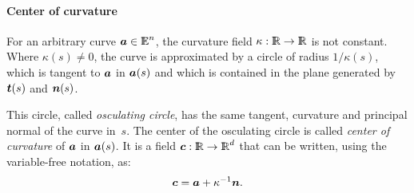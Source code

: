 \documentclass{31x47jw}
\begin{document}
% 
% 
%     
% 


\paragraph{Center of curvature}


For an arbitrary curve ${\mbox{\boldmath $a$}} \in \mathbb{I\!\!E}^{n}$, the curvature field
$\kappa:\mathbb{I\!\!R}\rightarrow\mathbb{I\!\!R}$ is not constant.  Where
$\kappa(s)\not=0$, the curve is approximated by a circle of radius
$1/\kappa(s)$, which is tangent to ${\mbox{\boldmath $a$}}$ in ${\mbox{\boldmath $a$}}(s)$ and which is
contained in the plane generated by ${\mbox{\boldmath $t$}}(s)$ and ${\mbox{\boldmath $n$}}(s)$.

This circle, called \emph{osculating circle}, has the same tangent, curvature
and principal normal of the curve in~$s$.  The center of the
osculating circle is called \emph{center of curvature} of ${\mbox{\boldmath $a$}}$ in
${\mbox{\boldmath $a$}}(s)$. It is a field ${\mbox{\boldmath $c$}}: \mathbb{I\!\!R}\rightarrow\mathbb{I\!\!R}^{d}$ that can be 
written, using the variable-free notation, as:
\[
{\mbox{\boldmath $c$}} = {\mbox{\boldmath $a$}} + \kappa^{-1} {\mbox{\boldmath $n$}}.
\]

% 
% 
% 
% 
% 
% 
% 
% 
% 
% 
\end{document}
